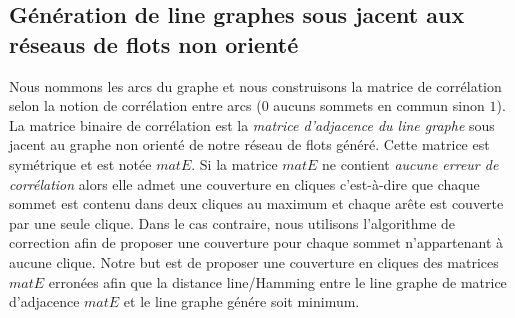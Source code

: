 \documentclass[onecolumn, 12pt]{book}
\begin{document}
\subsection{G\'en\'eration de line graphes sous jacent aux r\'eseaus de flots non orient\'e}
Nous nommons les arcs du graphe et nous construisons la matrice de corr\'elation selon la notion de corr\'elation entre arcs ($0$ aucuns sommets en commun sinon $1$).
La matrice binaire de corr\'elation est la {\em matrice d'adjacence du line graphe} sous jacent au graphe non orient\'e de notre r\'eseau de flots g\'en\'er\'e. Cette matrice est sym\'etrique et est not\'ee $matE$. \newline
Si la matrice $matE$ ne contient {\em aucune erreur de corr\'elation} alors elle admet une couverture en cliques c'est-\`a-dire que chaque sommet est contenu dans deux cliques au maximum et chaque ar\^ete est couverte par une seule clique.
Dans le cas contraire, nous utilisons l'algorithme de correction afin de proposer une couverture pour chaque sommet n'appartenant \`a aucune clique. 
\newline
Notre but est de proposer une couverture en cliques des matrices $matE$ erron\'ees afin que 
la distance line/Hamming entre le line graphe de matrice d'adjacence $matE$ et le line graphe g\'en\'ere soit minimum. 
\end{document}
